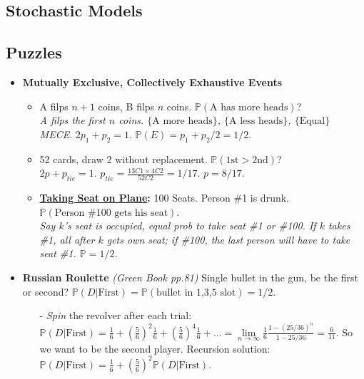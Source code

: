 \documentclass[9pt, landscape]{article}
\begin{document}
\begin{multicols*}{3}
\section{Stochastic Models}
\subsection{Puzzles}
\begin{itemize}
	\item \textbf{Mutually Exclusive, Collectively Exhaustive Events}
	\begin{itemize}[leftmargin=10pt,noitemsep,topsep=0pt,partopsep=0pt]
	 	\item A filps $n+1$ coins, B filps $n$ coins. $\mathbb{P}\left(\text{A has more heads}\right)$?\\
	 	\textit{A filps the first $n$ coins. $\{\text{A more heads}\}$, $\{\text{A less heads}\}$, $\{\text{Equal}\}$ MECE}. $2p_1 + p_2 = 1$. $\mathbb{P}\left(E\right) = p_1 + p_2/2 = 1/2$.
	 	\item 52 cards, draw 2 without replacement. $\mathbb{P}\left(\text{1st} > \text{2nd}\right)$?\\
	 	\textit{$2p+p_{tie} = 1$}. $p_{tie} = \frac{13C1 \times 4C2}{52C2} = 1/17$. $p=8/17$.
	 	\item \textbf{\href{https://math.stackexchange.com/questions/5595/taking-seats-on-a-plane?noredirect=1&lq=1}{Taking Seat on Plane}:}  100 Seats. Person \#1 is drunk. $\mathbb{P}\left(\text{Person \#100 gets his seat}\right)$.\\
	 	\textit{Say $k$'s seat is occupied, equal prob to take seat \#1 or \#100. If $k$ takes \#1, all after $k$ gets own seat; if \#100, the last person will have to take seat \#1. $\mathbb{P}=1/2$.}
	 \end{itemize} 
	\item \textbf{Russian Roulette} \textit{(Green Book pp.81)} Single bullet in the gun, be the first or second? $\mathbb{P}\left(D|\text{First}\right) = \mathbb{P}\left(\text{bullet in 1,3,5 slot}\right) = 1/2$.
	\begin{itemize}[leftmargin=10pt,noitemsep,topsep=0pt,partopsep=0pt]
		\item[-] \textit{Spin} the revolver after each trial: $\mathbb{P}\left(D|\text{First}\right) = \frac{1}{6} + (\frac{5}{6})^2 \frac{1}{6} + (\frac{5}{6})^4 \frac{1}{6} + ... = \lim\limits_{n\rightarrow\infty} \frac{1}{6} \frac{1-(25/36)^n}{1-25/36} = \frac{6}{11}$. So we want to be the second player. Recursion solution: $\mathbb{P}\left(D|\text{First}\right) = \frac{1}{6} + (\frac{5}{6})^2 \mathbb{P}\left(D|\text{First}\right)$.

\end{itemize}
\end{itemize}
\end{multicols*}
\end{document}
